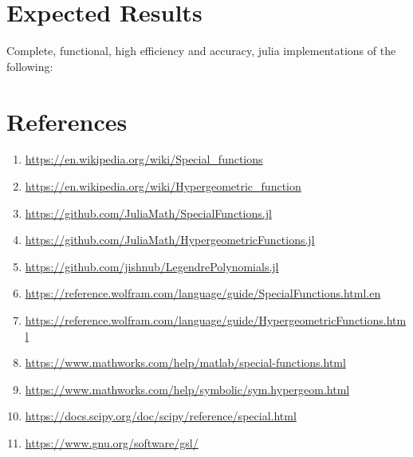 \documentclass{article}
\theoremstyle{mytheoremstyle}
\theoremstyle{mytheoremstyle}
\theoremstyle{myproblemstyle}
\begin{document}
  \section*{Expected Results}\label{sec:Results} %
    Complete, functional, high efficiency and accuracy, julia implementations of the following:
  
  \section*{References}\label{sec:References} %
  \begin{enumerate}
\item \url{https://en.wikipedia.org/wiki/Special_functions}
\item \url{https://en.wikipedia.org/wiki/Hypergeometric_function}
\item \url{https://github.com/JuliaMath/SpecialFunctions.jl}
\item \url{https://github.com/JuliaMath/HypergeometricFunctions.jl}
\item \url{https://github.com/jishnub/LegendrePolynomials.jl}
\item \url{https://reference.wolfram.com/language/guide/SpecialFunctions.html.en}
\item \url{https://reference.wolfram.com/language/guide/HypergeometricFunctions.html}
\item \url{https://www.mathworks.com/help/matlab/special-functions.html}
\item \url{https://www.mathworks.com/help/symbolic/sym.hypergeom.html}
\item \url{https://docs.scipy.org/doc/scipy/reference/special.html}
\item \url{https://www.gnu.org/software/gsl/}
  \end{enumerate}
  
\end{document}
